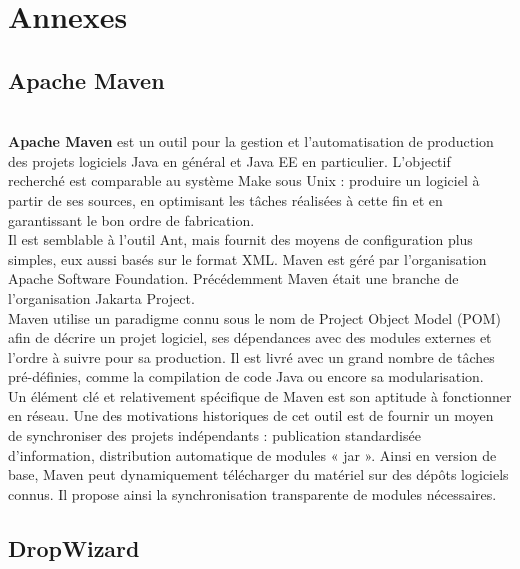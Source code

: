 \chapter{Annexes}
\label{Annexes}

\section{Apache Maven}\label{Annexe A}\\

\textbf{Apache Maven} est un outil pour la gestion et l'automatisation de production des projets logiciels Java en général et Java EE en particulier. L'objectif recherché est comparable au système Make sous Unix : produire un logiciel à partir de ses sources, en optimisant les tâches réalisées à cette fin et en garantissant le bon ordre de fabrication.\\
Il est semblable à l'outil Ant, mais fournit des moyens de configuration plus simples, eux aussi basés sur le format XML. Maven est géré par l'organisation Apache Software Foundation. Précédemment Maven était une branche de l'organisation Jakarta Project.\\
Maven utilise un paradigme connu sous le nom de Project Object Model (POM) afin de décrire un projet logiciel, ses dépendances avec des modules externes et l'ordre à suivre pour sa production. Il est livré avec un grand nombre de tâches pré-définies, comme la compilation de code Java ou encore sa modularisation.\\
Un élément clé et relativement spécifique de Maven est son aptitude à fonctionner en réseau. Une des motivations historiques de cet outil est de fournir un moyen de synchroniser des projets indépendants : publication standardisée d'information, distribution automatique de modules « jar ». Ainsi en version de base, Maven peut dynamiquement télécharger du matériel sur des dépôts logiciels connus. Il propose ainsi la synchronisation transparente de modules nécessaires.\\

\pagebreak

\section{DropWizard}\label{Annexe B}\\

